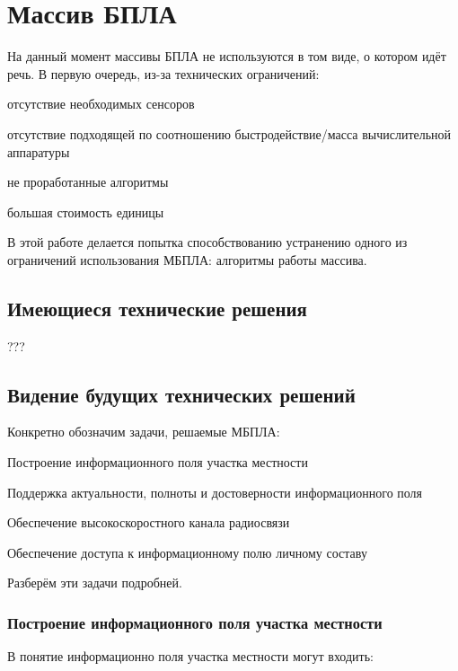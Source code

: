 \section{Массив БПЛА}

На данный момент массивы БПЛА не используются в том виде,
о котором идёт речь. В первую очередь, из-за технических
ограничений:
\begin{mintemize}
    \item отсутствие необходимых сенсоров
    \item отсутствие подходящей по соотношению быстродействие/масса
        вычислительной аппаратуры
    \item не проработанные алгоритмы
    \item большая стоимость единицы
\end{mintemize}

В этой работе делается попытка способствованию
устранению одного из ограничений использования МБПЛА:
алгоритмы работы массива.

\subsection{Имеющиеся технические решения}

???

\subsection{Видение будущих технических решений}

Конкретно обозначим задачи, решаемые МБПЛА:

\begin{mintemize}
\item Построение информационного поля участка местности
\item Поддержка актуальности, полноты и достоверности информационного поля
\item Обеспечение высокоскоростного канала радиосвязи
\item Обеспечение доступа к информационному полю личному составу
\end{mintemize}

Разберём эти задачи подробней.

\subsubsection{Построение информационного поля участка местности}

В понятие информационно поля участка местности могут входить:

